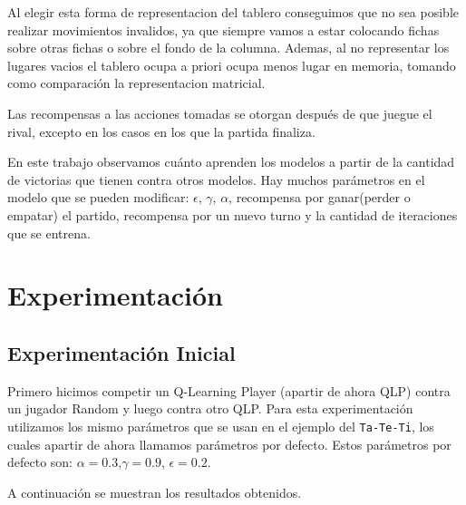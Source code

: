 \documentclass[10pt, a4paper]{article}
\begin{document}
Al elegir esta forma de representacion del tablero conseguimos que no sea posible realizar movimientos invalidos, ya que siempre vamos a estar colocando fichas sobre otras fichas o sobre el fondo de la columna. Ademas, al no representar los lugares vacios el tablero ocupa a priori ocupa menos lugar en memoria, tomando como comparación la representacion matricial.


Las recompensas a las acciones tomadas se otorgan después de que juegue el rival, excepto en los casos en los que la partida finaliza.


En este trabajo observamos cuánto aprenden los modelos a partir de la cantidad de victorias que tienen contra otros modelos.
Hay muchos parámetros en el modelo que se pueden modificar:
$\epsilon$,  $\gamma$, $\alpha$, recompensa por ganar(perder o empatar) el partido, recompensa por un nuevo turno y la cantidad de iteraciones que se entrena.


\section{Experimentación}


\subsection{Experimentación Inicial}


Primero hicimos competir un Q-Learning Player (apartir de ahora QLP) contra un jugador Random y luego contra otro QLP. Para esta experimentación utilizamos los mismo parámetros que se usan en el ejemplo del \texttt{Ta-Te-Ti}, los cuales apartir de ahora llamamos parámetros por defecto. Estos parámetros por defecto son: $\alpha=0.3$,$\gamma=0.9$, $\epsilon=0.2$.

A continuación se muestran los resultados obtenidos.
\end{document}
